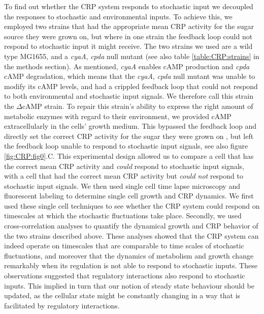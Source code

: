 To find out whether the CRP system responds to stochastic input we decoupled the responses to stochastic and environmental inputs.
%
To achieve this, we employed two strains that had the appropriate mean CRP activity for the sugar source they were grown on, 
but where in one strain the feedback loop could not respond to stochastic input it might receive.
%
The two strains we used are a wild type MG1655, and a \textit{cyaA}, \textit{cpda} null mutant \cite{Towbin2017} (see also table \ref{table:CRP:strains} in the methods section).
As mentioned, \textit{cyaA} enables cAMP production and \textit{cpda} cAMP degradation, 
%
which means that the \textit{cyaA}, \textit{cpda} null mutant was unable to modify its cAMP levels, and had a crippled feedback loop that could not respond to both environmental and stochastic input signals.
%
We therefore call this strain the $\Delta$cAMP strain.
%
%
To repair this strain's ability to express the right amount of metabolic enzymes with regard to their environment, 
we provided cAMP extracellularly in the cells' growth medium.
%
This bypassed the feedback loop and directly set the correct CRP activity for the sugar they were grown on \cite{Towbin2017},
but left the feedback loop unable to respond to stochastic input signals, see also figure \ref{fig:CRP:fig0}.C.
%
This experimental design allowed us to compare a cell that has the correct mean CRP activity and \textit{could} respond to stochastic input signals, 
with a cell that had the correct mean CRP activity but \textit{could not} respond to stochastic input signals.
%
We then used single cell time lapse microscopy and fluorescent labeling to determine single cell growth and CRP dynamics. 
%
We first used these single cell techniques to see whether the CRP system could respond on timescales at which the stochastic fluctuations take place.
%
Secondly, we used cross-correlation analyses to quantify the dynamical growth and CRP behavior of the two strains described above.
%
These analyses showed that the CRP system can indeed operate on timescales that are comparable to time scales of stochastic fluctuations, and moreover that
the dynamics of metabolism and growth change remarkably when its regulation is not able to respond to stochastic inputs.
%
These observations suggested that regulatory interactions also respond to stochastic inputs.
%
This implied in turn that our notion of steady state behaviour should be updated, 
as the cellular state might be constantly changing in a way that is facilitated by regulatory interactions.


